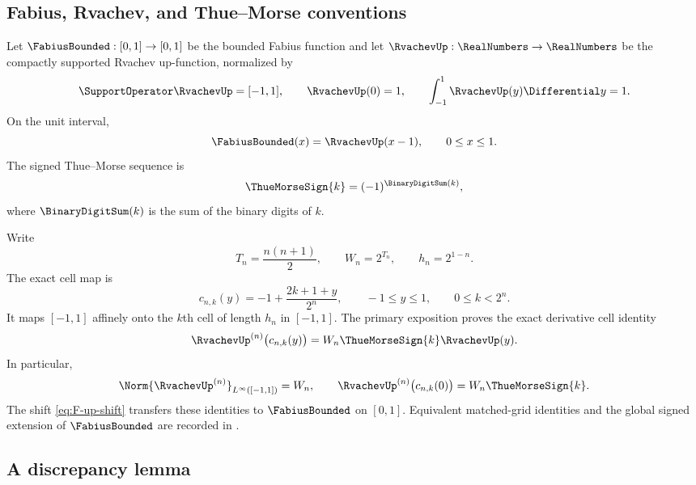 \documentclass[11pt,a4paper]{article}
\theoremstyle{definition}
\theoremstyle{remark}
\begin{document}
\subsection{Fabius, Rvachev, and Thue--Morse conventions}

Let $\FabiusBounded:[0,1]\to[0,1]$ be the bounded Fabius function and let
$\RvachevUp:\RealNumbers\to\RealNumbers$ be the compactly supported Rvachev up-function, normalized by
\[
  \SupportOperator\RvachevUp=[-1,1],\qquad \RvachevUp(0)=1,\qquad
  \int_{-1}^{1}\RvachevUp(y)\Differential y=1.
\]
On the unit interval,
\begin{equation}
  \FabiusBounded(x)=\RvachevUp(x-1),\qquad 0\le x\le1.
  \label{eq:F-up-shift}
\end{equation}
The signed Thue--Morse sequence is
\begin{equation}
  \ThueMorseSign{k}=(-1)^{\BinaryDigitSum(k)},
  \label{eq:tm}
\end{equation}
where $\BinaryDigitSum(k)$ is the sum of the binary digits of $k$.

Write
\begin{equation}
  T_n=\frac{n(n+1)}2,
  \qquad
  W_n=2^{T_n},
  \qquad
  h_n=2^{1-n}.
  \label{eq:weights-basic}
\end{equation}
The exact cell map is
\begin{equation}
  c_{n,k}(y)=-1+\frac{2k+1+y}{2^n},
  \qquad -1\le y\le1,
  \qquad 0\le k<2^n.
  \label{eq:cell-map}
\end{equation}
It maps $[-1,1]$ affinely onto the $k$th cell of length $h_n$ in $[-1,1]$.
The primary exposition proves the exact derivative cell identity
\begin{equation}
  \RvachevUp^{(n)}\bigl(c_{n,k}(y)\bigr)
  =W_n\ThueMorseSign{k}\RvachevUp(y).
  \label{eq:cell-identity}
\end{equation}
In particular,
\begin{equation}
  \Norm{\RvachevUp^{(n)}}_{L^\infty([-1,1])}=W_n,
  \qquad
  \RvachevUp^{(n)}\bigl(c_{n,k}(0)\bigr)=W_n\ThueMorseSign{k}.
  \label{eq:sharp-global}
\end{equation}
The shift \eqref{eq:F-up-shift} transfers these identities to $\FabiusBounded$ on $[0,1]$.
Equivalent matched-grid identities and the global signed extension of $\FabiusBounded$ are
recorded in \cite{ProveItMain,ProveItIterates}.

\subsection{A discrepancy lemma}
\end{document}
